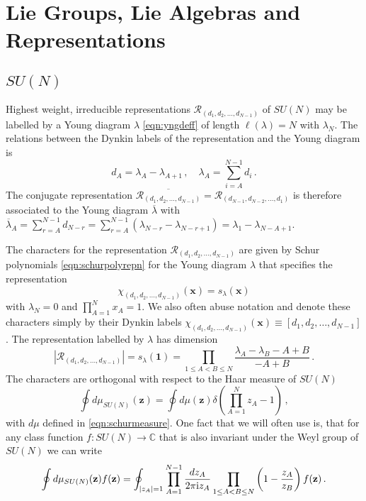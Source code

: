 \documentclass[main.tex]{subfiles}
\begin{document}
\section{Lie Groups, Lie Algebras and Representations}
\subsection{\texorpdfstring{$SU(N)$}{SU(N)}}
Highest weight, irreducible representations $\mathcal{R}_{(d_1,d_2,\dots,d_{N-1})}$ of $SU(N)$ may be labelled by a Young diagram $\lambda$ \eqref{eqn:yngdeff} of length $\ell(\lambda)=N$ with $\lambda_N$.
The relations between the Dynkin labels of the representation and the Young diagram is
\begin{equation}\label{eqn:youngdynkin}
d_A=\lambda_A-\lambda_{A+1}\,,\quad \lambda_A=\sum_{i=A}^{N-1}d_i\,.
\end{equation}
The conjugate representation $\overline{\mathcal{R}_{(d_1,d_2,\dots,d_{N-1})}}=\mathcal{R}_{(d_{N-1},d_{N-2},\dots,d_1)}$ is therefore associated to the Young diagram $\overline{\lambda}$ with $\overline{\lambda}_A=\sum_{r=A}^{N-1}d_{N-r}=\sum_{r=A}^{N-1}(\lambda_{N-r}-\lambda_{N-r+1})=\lambda_{1}-\lambda_{N-A+1}$.

The characters for the representation $\mathcal{R}_{(d_1,d_2,\dots,d_{N-1})}$ are given by Schur polynomials \eqref{eqn:schurpolyrepn} for the Young diagram $\lambda$ that specifies the representation
\begin{equation}\label{eqn:SUNChar}
\chi_{(d_1,d_2,\dots,d_{N-1})}(\mathbf{x})=s_{\lambda}(\mathbf{x})
\end{equation}
with $\lambda_N=0$ and $\prod_{A=1}^Nx_A=1$. We also often abuse notation and denote these characters simply by their Dynkin labels $\chi_{(d_1,d_2,\dots,d_{N-1})}(\mathbf{x})\equiv[d_1,d_2,\dots,d_{N-1}]$. The representation labelled by $\lambda$ has dimension
\begin{equation}
|\mathcal{R}_{(d_1,d_2,\dots,d_{N-1})}|=s_{\lambda}(\mathbf{1})=\prod_{1\leq A<B\leq N}\frac{\lambda_A-\lambda_B-A+B}{-A+B}\,.
\end{equation}
The characters are orthogonal with respect to the Haar measure of $SU(N)$ 
\begin{equation}\label{eqn:Haarmeasure}
\oint d\mu_{SU(N)}(\mathbf{z})=\oint d\mu(\mathbf{z})\delta\left(\prod_{A=1}^Nz_A-1\right)\,,
\end{equation}
with $d\mu$ defined in \eqref{eqn:schurmeasure}.
One fact that we will often use is, that for any class function $f:SU(N)\to\mathbb{C}$ that is also invariant under the Weyl group of $SU(N)$ we can write
\begin{equation}
\oint d\mu_{SU(N)}(\mathbf{z})f(\mathbf{z})=\oint_{|z_A|=1}\prod_{A=1}^{N-1}\frac{dz_A}{2\pi\mathrm{i} z_A}\prod_{1\leq A<B\leq N}\left(1-\frac{z_A}{z_B}\right)f(\mathbf{z})\,.
\end{equation}
\end{document}

